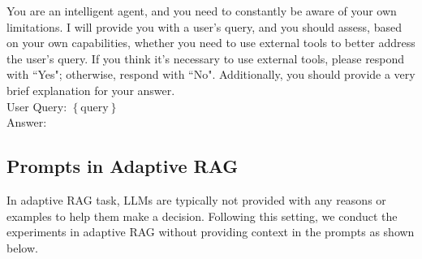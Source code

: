\begin{tcolorbox}[colback=green!20, colframe=black, title=Prompt without context.]
You are an intelligent agent, and you need to constantly be aware of your own limitations. I will provide you with a user's query, and you should assess, based on your own capabilities, whether you need to use external tools to better address the user's query. If you think it's necessary to use external tools, please respond with ``Yes"; otherwise, respond with ``No". Additionally, you should provide a very brief explanation for your answer.\\

User Query: $\left\{ \text{query} \right\}$\\

Answer: 
\end{tcolorbox}




\subsection{Prompts in Adaptive RAG}
In adaptive RAG task, LLMs are typically not provided with any reasons or examples to help them make a decision. Following this setting, we conduct the experiments in adaptive RAG without providing context in the prompts as shown below.




